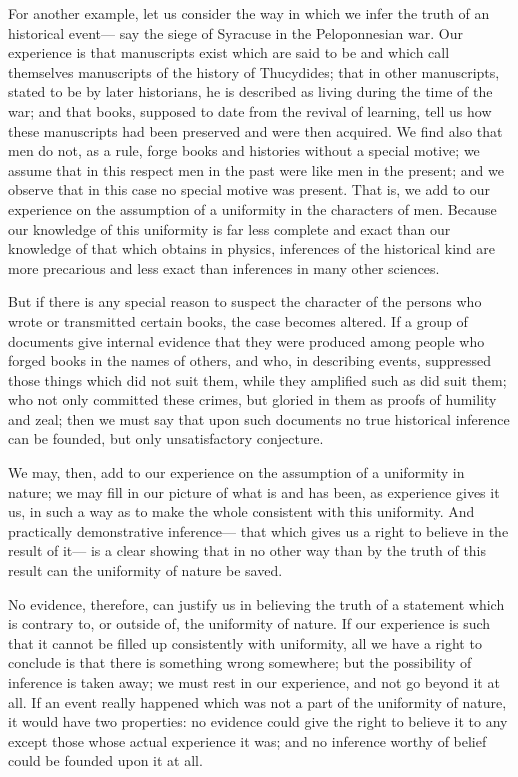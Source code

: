 \documentclass[12pt]{article}
\begin{document}
For another example, let us consider the way in which we infer the truth of an historical event--- say the siege of Syracuse in the Peloponnesian war. Our experience is that manuscripts exist which are said to be and which call themselves manuscripts of the history of Thucydides; that in other manuscripts, stated to be by later historians, he is described as living during the time of the war; and that books, supposed to date from the revival of learning, tell us how these manuscripts had been preserved and were then acquired. We find also that men do not, as a rule, forge books and histories without a special motive; we assume that in this respect men in the past were like men in the present; and we observe that in this case no special motive was present. That is, we add to our experience on the assumption of a uniformity in the characters of men. Because our knowledge of this uniformity is far less complete and exact than our knowledge of that which obtains in physics, inferences of the historical kind are more precarious and less exact than inferences in many other sciences.

But if there is any special reason to suspect the character of the persons who wrote or transmitted certain books, the case becomes altered. If a group of documents give internal evidence that they were produced among people who forged books in the names of others, and who, in describing events, suppressed those things which did not suit them, while they amplified such as did suit them; who not only committed these crimes, but gloried in them as proofs of humility and zeal; then we must say that upon such documents no true historical inference can be founded, but only unsatisfactory conjecture.

We may, then, add to our experience on the assumption of a uniformity in nature; we may fill in our picture of what is and has been, as experience gives it us, in such a way as to make the whole consistent with this uniformity. And practically demonstrative inference--- that which gives us a right to believe in the result of it--- is a clear showing that in no other way than by the truth of this result can the uniformity of nature be saved.

No evidence, therefore, can justify us in believing the truth of a statement which is contrary to, or outside of, the uniformity of nature. If our experience is such that it cannot be filled up consistently with uniformity, all we have a right to conclude is that there is something wrong somewhere; but the possibility of inference is taken away; we must rest in our experience, and not go beyond it at all. If an event really happened which was not a part of the uniformity of nature, it would have two properties: no evidence could give the right to believe it to any except those whose actual experience it was; and no inference worthy of belief could be founded upon it at all.
\end{document}
